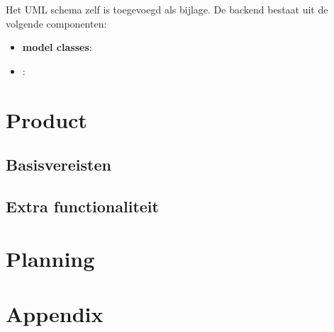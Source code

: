 \documentclass[12pt,a4paper]{article}
\begin{document}
Het UML schema zelf is toegevoegd als bijlage. De backend bestaat uit de volgende componenten:

\begin{itemize}

\item \textbf{model classes}:  

\item \textbf{}:

\end{itemize}

\section{Product}

\subsection{Basisvereisten}

\subsection{Extra functionaliteit}

\section{Planning}

\section{Appendix}
\end{document}
